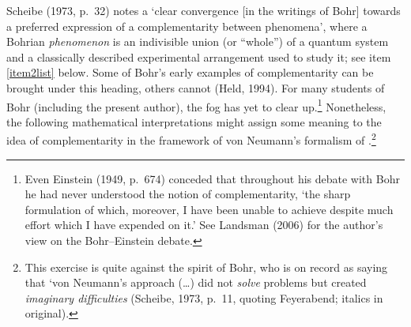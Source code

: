 \documentclass[12pt,titlepage]{article}
\begin{document}
Scheibe (1973, p.\ 32) notes a `clear convergence [in the writings of Bohr] towards a preferred expression of a complementarity between phenomena', where a Bohrian {\it phenomenon} is an indivisible union (or ``whole'') of a quantum system and a classically described experimental arrangement used to study it; see item \ref{item2list} below. Some of Bohr's early examples of 
complementarity can be brought under this heading, others  cannot (Held, 1994). For many students of Bohr (including the present author), the fog has yet to clear up.\footnote{Even Einstein (1949, p.\ 674) conceded that throughout his debate with Bohr he had never understood the notion of complementarity, `the sharp formulation of which, moreover, 
 I have been unable to achieve despite much effort which I have expended on it.' See Landsman (2006) for the author's view on the Bohr--Einstein debate. }
 Nonetheless, the following mathematical interpretations might assign some meaning to the idea of complementarity in the framework of von Neumann's formalism of \qm.\footnote{This exercise is quite against the spirit of Bohr, who is on record as saying that `von Neumann's approach (\ldots) did not {\it solve} problems but created {\it imaginary difficulties} (Scheibe, 1973, p.\ 11, quoting Feyerabend; italics in original).} 
\end{document}
